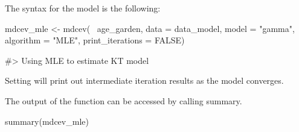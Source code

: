 The syntax for the model is the following:

\begin{example}
mdcev_mle <- mdcev(~ age_garden,
                  data = data_model,
                  model = "gamma",
                  algorithm = "MLE",
                  print_iterations = FALSE)

#> Using MLE to estimate KT model
\end{example}

Setting  will print out intermediate
iteration results as the model converges.

The output of the function can be accessed by calling summary.

\begin{example}
summary(mdcev_mle)


\end{example}
